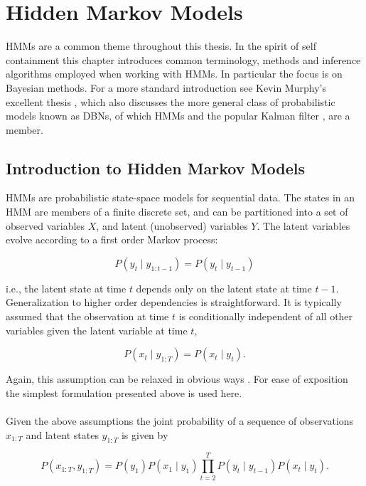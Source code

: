 \documentclass[12pt]{report}
\newcommand{\1}[0]{\mathbbm{1}}
\newcommand{\seq}[3]{\ensuremath{#1_{{#2}:{#3}}}}
\begin{document}
\chapter{Hidden Markov Models}
\label{chap: Hidden Markov Models}
\acp{HMM} \cite{rabiner-hmms} are a common theme throughout this thesis.
In the spirit of self containment this chapter introduces common terminology,
methods and inference algorithms employed when working with \acp{HMM}. In particular
the focus is on Bayesian methods. For a more standard introduction see Kevin Murphy's excellent thesis
\cite{murphy-thesis}, which also discusses the more general class of probabilistic models
known as \acp{DBN}, of which \acp{HMM} and the popular Kalman filter \cite{kalman-filter}, are a member.

\section{Introduction to Hidden Markov Models}
\label{sec:Introduction to Hidden Markov Models}
\acp{HMM} are probabilistic state-space models for sequential data.
The states in an \ac{HMM} are members of a finite discrete set, and
can be partitioned into a set of observed variables $X$, and latent
(unobserved) variables $Y$. The latent variables evolve according to
a first order Markov process:

\[
    P(y_t \mid \seq{y}{1}{t-1}) = P(y_t \mid y_{t-1})
\]

i.e., the latent state at time $t$ depends only on the latent state
at time $t-1$. Generalization to higher order dependencies is straightforward.
It is typically assumed that the observation at time $t$ is conditionally
independent of all other variables given the latent variable at time $t$,

\[
    P(x_t \mid \seq{y}{1}{T}) = P(x_t \mid y_t).
\]

Again, this assumption can be relaxed in obvious ways \cite{autoregressive-shannon}.
For ease of exposition the simplest formulation presented above is used here.
\\\\
Given the above assumptions the joint probability of a sequence of observations
$\seq{x}{1}{T}$ and latent states $\seq{y}{1}{T}$ is given by

\begin{equation}\label{eq:hmm-joint}
    P(\seq{x}{1}{T}, \seq{y}{1}{T}) =
    P(y_1)P(x_1 \mid y_1) \prod_{t=2}^T P(y_t \mid y_{t-1}) P(x_t \mid y_t).
\end{equation}
\end{document}
